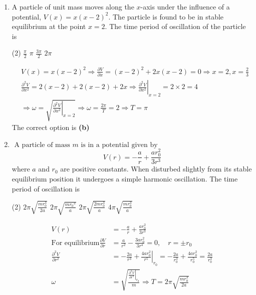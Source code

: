 \begin{enumerate}
	\item A particle of unit mass moves along the $x$-axis under the influence of a potential, $V(x)=x(x-2)^{2}$. The particle is found to be in stable equilibrium at the point $x=2$. The time period of oscillation of the particle is
	{}
\begin{tasks}(2)
	\task[\textbf{A.}] $\frac{\pi}{2}$
	\task[\textbf{B.}]$\pi$
	\task[\textbf{C.}]$\frac{3 \pi}{2}$
	\task[\textbf{D.}] $2 \pi$
\end{tasks}
\begin{answer}
	\begin{align*}
	&V(x)=x(x-2)^{2} \Rightarrow \frac{\partial V}{\partial x}=(x-2)^{2}+2 x(x-2)=0 \Rightarrow x=2, x=\frac{2}{3}\\
		&\frac{\partial^{2} V}{\partial x^{2}}=2(x-2)+2(x-2)+\left.2 x \Rightarrow \frac{\partial^{2} V}{\partial x^{2}}\right|_{x=2}=2 \times 2=4 \\
		&\Rightarrow \omega=\sqrt{\left.\frac{\partial^{2} V}{\partial x^{2}}\right|_{x=2}} \Rightarrow \omega=\frac{2 \pi}{T}=2 \Rightarrow T=\pi
	\end{align*}
	The correct option is \textbf{(b)}
\end{answer}
	\item $\text { A particle of mass } m \text { is in a potential given by }$
	$$V(r)=-\frac{a}{r}+\frac{a r_{0}^{2}}{3 r^{3}}$$
	where $a$ and $r_{0}$ are positive constants. When disturbed slightly from its stable equilibrium position it undergoes a simple harmonic oscillation. The time period of oscillation is
	{}
\begin{tasks}(2)
	\task[\textbf{A.}] $2 \pi \sqrt{\frac{m r_{0}^{3}}{2 a}}$
	\task[\textbf{B.}]$2 \pi \sqrt{\frac{m r_{0}{ }^{3}}{a}}$
	\task[\textbf{C.}]$2 \pi \sqrt{\frac{2 m r_{0}^{3}}{a}}$
	\task[\textbf{D.}]$4 \pi \sqrt{\frac{m r_{0}^{3}}{a}}$
\end{tasks}
\begin{answer}
	\begin{align*}
	V(r)&=-\frac{a}{r}+\frac{a r_{0}^{2}}{3 r^{3}}\\
	\text{For equilibrium} \frac{\partial V}{\partial r}&=\frac{a}{r^{2}}-\frac{3 a r_{0}^{2}}{3 r^{4}}=0, \quad r=\pm r_{0} \\
	\frac{\partial^{2} V}{\partial r^{2}}&=-\frac{2 a}{r^{3}}+\left.\frac{4 a r_{0}^{2}}{r^{5}}\right|_{r_{0}}=-\frac{2 a}{r_{0}^{3}}+\frac{4 a r_{0}^{2}}{r_{0}^{5}}=\frac{2 a}{r_{0}^{3}}\\
	\omega&=\sqrt{\frac{\left.\frac{\partial^{2} V}{\partial r^{2}}\right|_{r_{0}}}{m}} \Rightarrow T=2 \pi \sqrt{\frac{m r_{0}^{3}}{2 a}}

\end{align*}
\end{answer}
\end{enumerate}
